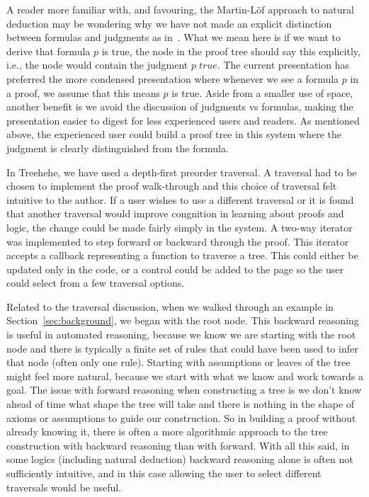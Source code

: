 \documentclass[conference]{IEEEtran}
\newcommand{\projectname}{Treehehe}
\begin{document}
A reader more familiar with, and favouring, the Martin-L{\"o}f approach to natural deduction may be wondering why we have not made an explicit distinction between formulas and judgments as in~\cite{natded-pfenning}. What we mean here is if we want to derive that formula $p$ is true, the node in the proof tree should say this explicitly, i.e., the node would contain the judgment $p \; \mathit{true}$. The current presentation has preferred the more condensed presentation where whenever we see a formula $p$ in a proof, we assume that this means $p$ is true. Aside from a smaller use of space, another benefit is we avoid the discussion of judgments vs formulas, making the presentation easier to digest for less experienced users and readers. As mentioned above, the experienced user could build a proof tree in this system where the judgment is clearly distinguished from the formula.

In \projectname{}, we have used a depth-first preorder traversal. A traversal had to be chosen to implement the proof walk-through and this choice of traversal felt intuitive to the author. If a user wishes to use a different traversal or it is found that another traversal would improve congnition in learning about proofs and logic, the change could be made fairly simply in the system. A two-way iterator was implemented to step forward or backward through the proof. This iterator accepts a callback representing a function to traverse a tree. This could either be updated only in the code, or a control could be added to the page so the user could select from a few traversal options.

Related to the traversal discussion, when we walked through an example in Section~\ref{sec:background}, we began with the root node. This backward reasoning is useful in automated reasoning, because we know we are starting with the root node and there is typically a finite set of rules that could have been used to infer that node (often only one rule). Starting with assumptions or leaves of the tree might feel more natural, because we start with what we know and work towards a goal. The issue with forward reasoning when constructing a tree is we don't know ahead of time what shape the tree will take and there is nothing in the shape of axioms or assumptions to guide our construction. So in building a proof without already knowing it, there is often a more algorithmic approach to the tree construction with backward reasoning than with forward. With all this said, in some logics (including natural deduction) backward reasoning alone is often not sufficiently intuitive, and in this case allowing the user to select different traversals would be useful.
\end{document}
